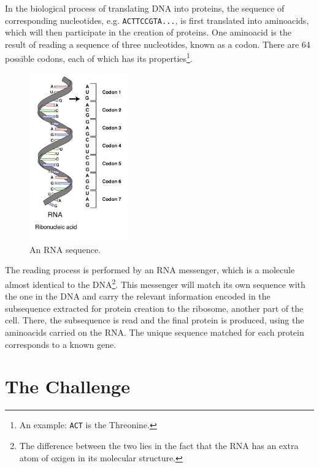 \documentclass[a4paper, 11pt]{article} %
\begin{document}
In the biological process of translating DNA into proteins, the sequence of corresponding nucleotides, e.g. \texttt{ACTTCCGTA...}, is first translated into aminoacids, which will then participate in the creation of proteins. One aminoacid is the result of reading a sequence of three nucleotides, known as a codon. There are 64 possible codons, each of which has its properties\footnote{An example: \texttt{ACT} is the Threonine.}.

\begin{figure} %
\begin{center}
\includegraphics[width=0.38\textwidth]{rna_codons.png}
\end{center}
\caption{An RNA sequence.}
\end{figure}

The reading process is performed by an RNA messenger, which is a molecule almost identical to the DNA\footnote{The difference between the two lies in the fact that the RNA has an extra atom of oxigen in its molecular structure.}. This messenger will match its own sequence with the one in the DNA and carry the relevant information encoded in the subsequence extracted for protein creation to the ribosome, another part of the cell. There, the subsequence is read and the final protein is produced, using the aminoacids carried on the RNA. The unique sequence matched for each protein corresponds to a known gene.


\section*{The Challenge}
\end{document}
